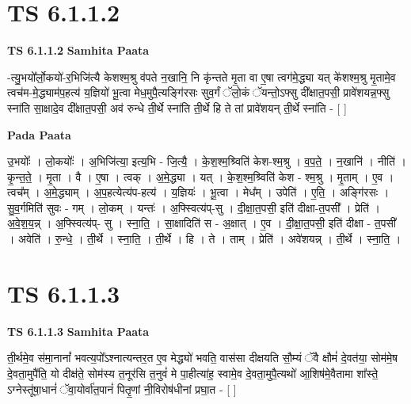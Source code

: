 \documentclass[17pt]{extarticle}
\begin{document}
\section*{ TS 6.1.1.2 }

\textbf{TS 6.1.1.2 } \newline
\textbf{Samhita Paata} \newline

-त्यु॒भयो᳚र्लो॒कयो॑-र॒भिजि॑त्यै केशश्म॒श्रु व॑पते न॒खानि॒ नि कृ॑न्तते मृ॒ता वा ए॒षा त्वग॑मे॒द्ध्या यत् के॑शश्म॒श्रु मृ॒तामे॒व त्वच॑म-मे॒द्ध्याम॑प॒हत्य॑ य॒ज्ञियो॑ भू॒त्वा मेध॒मुपै॒त्यङ्गि॑रसः सुव॒र्गं ॅलो॒कं ॅयन्तो॒ऽफ्सु दी᳚क्षात॒पसी॒ प्रावे॑शयन्न॒फ्सु स्ना॑ति सा॒क्षादे॒व दी᳚क्षात॒पसी॒ अव॑ रुन्धे ती॒र्थे स्ना॑ति ती॒र्थे हि ते तां प्रावे॑शयन् ती॒र्थे स्ना॑ति - [  ] \newline

\textbf{Pada Paata} \newline

उ॒भयोः᳚ । लो॒कयोः᳚ । अ॒भिजि॑त्या॒ इत्य॒भि - जि॒त्यै॒ । के॒श॒श्म॒श्र्विति॑ केश-श्म॒श्रु । व॒प॒ते॒ । न॒खानि॑ । नीति॑ । कृ॒न्त॒ते॒ । मृ॒ता । वै । ए॒षा । त्वक् । अ॒मे॒द्ध्या । यत् । के॒श॒श्म॒श्र्विति॑ केश - श्म॒श्रु । मृ॒ताम् । ए॒व । त्वच᳚म् । अ॒मे॒द्ध्याम् । अ॒प॒हत्येत्य॑प-हत्य॑ । य॒ज्ञियः॑ । भू॒त्वा । मेध᳚म् । उपेति॑ । ए॒ति॒ । अङ्गि॑रसः । सु॒व॒र्गमिति॑ सुवः - गम् । लो॒कम् । यन्तः॑ । अ॒फ्स्वित्य॑प्-सु । दी॒क्षा॒त॒पसी॒ इति॑ दीक्षा-त॒पसी᳚ । प्रेति॑ । अ॒वे॒श॒य॒न्न् । अ॒फ्स्वित्य॑प्- सु । स्ना॒ति॒ । सा॒क्षादिति॑ स - अ॒क्षात् । ए॒व । दी॒क्षा॒त॒पसी॒ इति॑ दीक्षा - त॒पसी᳚ । अवेति॑ । रु॒न्धे॒ । ती॒र्थे । स्ना॒ति॒ । ती॒र्थे । हि । ते । ताम् । प्रेति॑ । अवे॑शयन्न् । ती॒र्थे । स्ना॒ति॒ ।  \newline




\section*{ TS 6.1.1.3 }

\textbf{TS 6.1.1.3 } \newline
\textbf{Samhita Paata} \newline

ती॒र्थमे॒व स॑मा॒नानां᳚ भवत्य॒पो᳚ऽश्नात्यन्तर॒त ए॒व मेद्ध्यो॑ भवति॒ वास॑सा दीक्षयति सौ॒म्यं ॅवै क्षौमं॑ दे॒वत॑या॒ सोम॑मे॒ष दे॒वता॒मुपै॑ति॒ यो दीक्ष॑ते॒ सोम॑स्य त॒नूर॑सि त॒नुवं॑ मे पा॒हीत्या॑ह॒ स्वामे॒व दे॒वता॒मुपै॒त्यथो॑ आ॒शिष॑मे॒वैतामा शा᳚स्ते॒ ऽग्नेस्तू॑षा॒धानं॑ ॅवा॒योर्वा॑त॒पानं॑ पितृ॒णां नी॒विरोष॑धीनां प्रघा॒त - [  ] \newline
\end{document}
